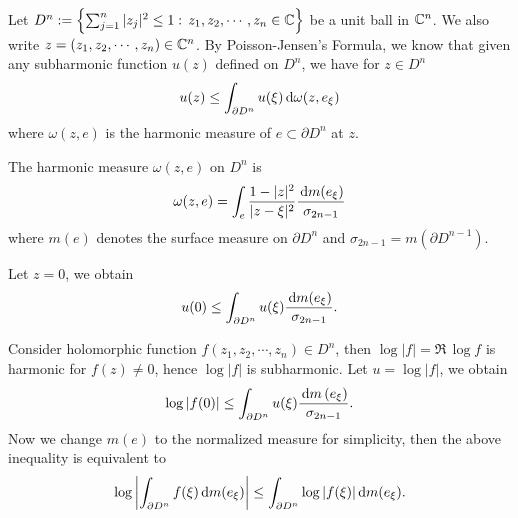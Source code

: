 Let $D^{n}:=\left\{\sum_{j=1}^{n} |z_j|^2\le 1:\, z_1,z_2,\cdots ,z_n\in \mathbb{C}\right\} $ be a unit ball in $\mathbb{C}^{n}$. We also write $z=(z_1,z_2,\cdots ,z_n)\in \mathbb{C}^{n}$.
By Poisson-Jensen's Formula, we know that given any subharmonic function $u(z)$ defined on $D^{n}$, we have for $z\in D^{n}$
\[
u(z)\le \int_{\partial D^{n}}u(\xi)\,\mathrm{d} \omega(z,e_\xi)
\] 
where $\omega(z,e)$ is the harmonic measure of $e\subset \partial D^{n}$ at $z$. 

The harmonic measure $\omega(z,e)$ on $D^{n}$ is 
\[
\omega(z,e)=\int_e \frac{1-|z|^2}{|z-\xi|^2}\frac{\,\mathrm{d} m(e_\xi)}{\sigma_{2n-1}}
\] 
where $m(e)$ denotes the surface measure on $\partial D^{n}$ and $\sigma_{2n-1}=m(\partial D^{n-1})$.

Let $z=0$, we obtain
\[
u(0)\le \int_{\partial D^{n}}u(\xi) \frac{\,\mathrm{d} m(e_\xi)}{\sigma_{2n-1}}.
\]

Consider holomorphic function $f(z_1,z_2,\cdots ,z_n) \in D^{n}$, then $\log |f|=\Re\,\log f$ is harmonic for $f(z)\neq 0$, hence $\log|f|$ is subharmonic. Let $u=\log|f|$, we obtain
\[
	\log |f(0)|\le \int_{\partial D^{n}}u(\xi) \frac{\,\mathrm{d} m\left( e_{\xi} \right) }{\sigma_{2n-1}}.
\]
Now we change $m(e)$ to the normalized measure for simplicity, then the above inequality is equivalent to 
\[
\log\left| \int_{\partial D^{n}}f(\xi) \,\mathrm{d} m(e_{\xi}) \right| \le \int_{\partial D^{n}}\log|f(\xi)| \,\mathrm{d} m(e_{\xi}).
\] 

\begin{comment}
Now we can use the conformal mapping  $\phi:D^{n}\to \mathbb{H}^{2n}:=\left\{\left( x_1,y_1,\cdots ,x_n,y_n \right)\in \R^{2n} :y_n>0\right\} $
\begin{equation*}
	\begin{aligned}
		\phi:z \mapsto \eta =& \left( \frac{2z_1}{\sum_{j=1}^{n-1} |z_j|^2+|x_n|^2+\left( 1-|y_n|^2 \right) },\cdots , \frac{2z_{n-1}}{\sum_{j=1}^{n-1} |z_j|^2+|x_n|^2+\left( 1-|y_n|^2 \right) },\right.\\
			       &\left.\frac{2x_n}{\sum_{j=1}^{n-1} |z_j|^2+|x_n|^2+\left( 1-|y_n|^2 \right) }, \frac{1-\sum_{j=1}^{n} |z_j|^2}{\sum_{j=1}^{n-1} |z_j|^2+|x_n|^2+\left( 1-|y_n|^2 \right) } \right) 
\end{aligned}
\end{equation*}
\end{comment}

